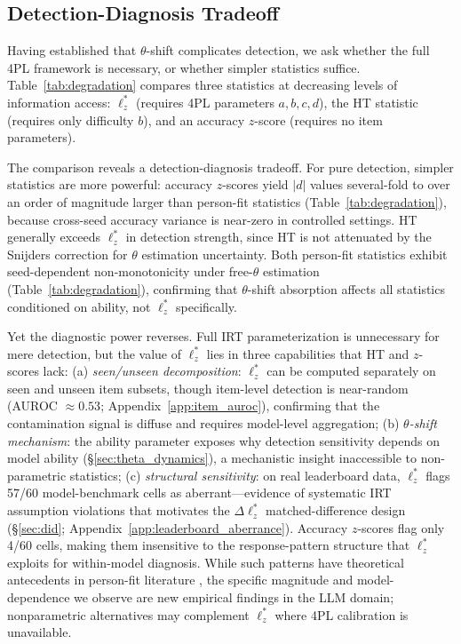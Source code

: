 \subsection{Detection-Diagnosis Tradeoff}
\label{sec:degradation}

Having established that $\theta$-shift complicates detection, we ask whether the full 4PL framework is necessary, or whether simpler statistics suffice.
Table~\ref{tab:degradation} compares three statistics at decreasing levels of information access: $\ell_z^*$ (requires 4PL parameters $a, b, c, d$), the HT statistic (requires only difficulty $b$), and an accuracy $z$-score (requires no item parameters).

The comparison reveals a detection-diagnosis tradeoff.
For pure detection, simpler statistics are more powerful: accuracy $z$-scores yield $|d|$ values several-fold to over an order of magnitude larger than person-fit statistics (Table~\ref{tab:degradation}), because cross-seed accuracy variance is near-zero in controlled settings.
HT generally exceeds $\ell_z^*$ in detection strength, since HT is not attenuated by the Snijders correction for $\theta$ estimation uncertainty.
Both person-fit statistics exhibit seed-dependent non-monotonicity under free-$\theta$ estimation (Table~\ref{tab:degradation}), confirming that $\theta$-shift absorption affects all statistics conditioned on ability, not $\ell_z^*$ specifically.

Yet the diagnostic power reverses.
Full IRT parameterization is unnecessary for mere detection, but the value of $\ell_z^*$ lies in three capabilities that HT and $z$-scores lack:
(a) \emph{seen/unseen decomposition}: $\ell_z^*$ can be computed separately on seen and unseen item subsets, though item-level detection is near-random (AUROC $\approx 0.53$; Appendix~\ref{app:item_auroc}), confirming that the contamination signal is diffuse and requires model-level aggregation;
(b) \emph{$\theta$-shift mechanism}: the ability parameter exposes why detection sensitivity depends on model ability (\S\ref{sec:theta_dynamics}), a mechanistic insight inaccessible to non-parametric statistics;
(c) \emph{structural sensitivity}: on real leaderboard data, $\ell_z^*$ flags 57/60 model-benchmark cells as aberrant---evidence of systematic IRT assumption violations that motivates the $\Delta\ell_z^*$ matched-difference design (\S\ref{sec:did}; Appendix~\ref{app:leaderboard_aberrance}).
Accuracy $z$-scores flag only 4/60 cells, making them insensitive to the response-pattern structure that $\ell_z^*$ exploits for within-model diagnosis.
While such patterns have theoretical antecedents in person-fit literature \citep{stonge2011}, the specific magnitude and model-dependence we observe are new empirical findings in the LLM domain; nonparametric alternatives \citep{tendeiro2014} may complement $\ell_z^*$ where 4PL calibration is unavailable.

